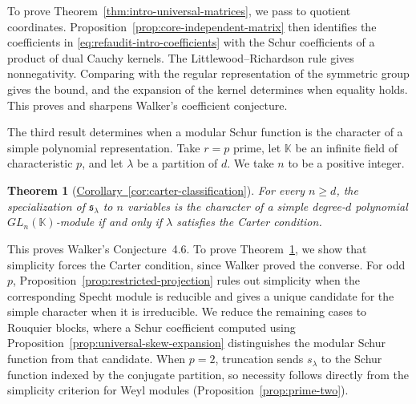\documentclass[12pt,reqno,a4paper]{amsart}
\numberwithin{equation}{section}
\numberwithin{figure}{section}
\theoremstyle{plain}
\newtheorem{mainthm}{Theorem}
\theoremstyle{definition}
\begin{document}
To prove Theorem~\ref{thm:intro-universal-matrices}, we pass to quotient
coordinates.  Proposition~\ref{prop:core-independent-matrix} then
identifies the coefficients in \eqref{eq:refaudit-intro-coefficients}
with the Schur coefficients of a product of dual Cauchy kernels.
The Littlewood--Richardson rule gives nonnegativity.  Comparing
with the regular representation of the symmetric group gives the
bound, and the expansion of the kernel determines when equality
holds.  This proves and sharpens Walker's coefficient conjecture.

The third result determines when a modular Schur function is the
character of a simple polynomial representation.  Take $r=p$ prime, let $\mathbb K$
be an infinite field of characteristic $p$, and let $\lambda$ be a
partition of $d$.  We take $n$ to be a positive integer.

\begin{mainthm}[{\hyperref[cor:carter-classification]{Corollary~\ref*{cor:carter-classification}}}]
\label{thm:intro-simple-classification}
For every $n\geq d$, the specialization of $\mathfrak{s}_\lambda$
to $n$ variables is the character of a simple degree-$d$ polynomial
$GL_n(\mathbb K)$-module if and only if $\lambda$ satisfies the
Carter condition.
\end{mainthm}

This proves Walker's Conjecture~4.6.  To prove
Theorem~\ref{thm:intro-simple-classification}, we show that simplicity
forces the Carter condition, since Walker proved the converse.
For odd $p$, Proposition~\ref{prop:restricted-projection} rules out
simplicity when the corresponding Specht module is reducible and gives
a unique candidate for the simple character when it is irreducible.
We reduce the remaining cases to Rouquier blocks, where a Schur
coefficient computed using Proposition~\ref{prop:universal-skew-expansion}
distinguishes the modular Schur function from that candidate.
When $p=2$, truncation sends $s_\lambda$ to the Schur function indexed
by the conjugate partition, so necessity follows directly from the
simplicity criterion for Weyl modules (Proposition~\ref{prop:prime-two}).
\end{document}
